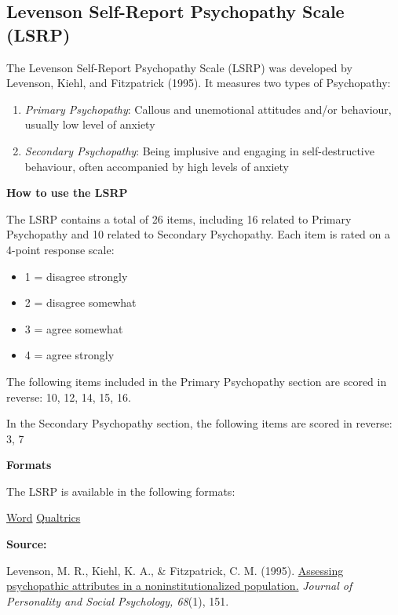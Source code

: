 \documentclass[
]{book}
\providecommand{\tightlist}{%
  \setlength{\itemsep}{0pt}\setlength{\parskip}{0pt}}
\begin{document}
\hypertarget{levenson-self-report-psychopathy-scale-lsrp}{%
\subsection{Levenson Self-Report Psychopathy Scale (LSRP)}\label{levenson-self-report-psychopathy-scale-lsrp}}

The Levenson Self-Report Psychopathy Scale (LSRP) was developed by Levenson, Kiehl, and Fitzpatrick (1995). It measures two types of Psychopathy:

\begin{enumerate}
\def\labelenumi{\arabic{enumi}.}
\tightlist
\item
  \emph{Primary Psychopathy}: Callous and unemotional attitudes and/or behaviour, usually low level of anxiety
\item
  \emph{Secondary Psychopathy}: Being implusive and engaging in self-destructive behaviour, often accompanied by high levels of anxiety
\end{enumerate}

\textbf{How to use the LSRP}

The LSRP contains a total of 26 items, including 16 related to Primary Psychopathy and 10 related to Secondary Psychopathy. Each item is rated on a 4-point response scale:

\begin{itemize}
\tightlist
\item
  1 = disagree strongly
\item
  2 = disagree somewhat
\item
  3 = agree somewhat
\item
  4 = agree strongly
\end{itemize}

The following items included in the Primary Psychopathy section are scored in reverse: 10, 12, 14, 15, 16.

In the Secondary Psychopathy section, the following items are scored in reverse: 3, 7

\textbf{Formats}

The LSRP is available in the following formats:

\href{/questionnaires/LevensonSelf-ReportPsychopathyScale_LSRP.docx}{Word} \textbar{} \href{/questionnaires/LevensonSelf-ReportPsychopathyScale_LSRP.qsf}{Qualtrics}

\textbf{Source:}

Levenson, M. R., Kiehl, K. A., \& Fitzpatrick, C. M. (1995). \href{https://www.researchgate.net/profile/Michael_Levenson2/publication/15338539_Assessing_Psychopathic_Attributes_in_a_Noninstitutionalized_Population/links/54b6d8360cf2bd04be334b31.pdf}{Assessing psychopathic attributes in a noninstitutionalized population.} \emph{Journal of Personality and Social Psychology, 68}(1), 151.
\end{document}
